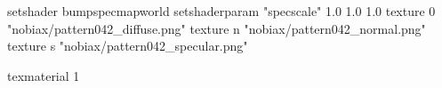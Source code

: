 setshader bumpspecmapworld
setshaderparam "specscale" 1.0 1.0 1.0
   texture 0 "nobiax/pattern042_diffuse.png"
   texture n "nobiax/pattern042_normal.png"
   texture s "nobiax/pattern042_specular.png"

texmaterial 1
